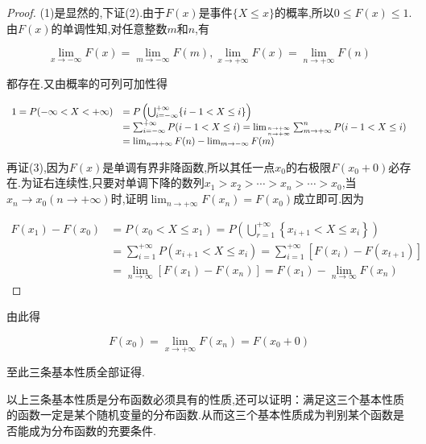 \begin{proof}
	(1)是显然的,下证(2).由于$ F(x) $是事件$\{X \leqslant x\}$的概率,所以$ 0\leq 
	F(x)\leq 1 $.由$ F(x) $的单调性知,对任意整数$ m $和$ n $,有
	
	\[ 
	\lim _{x \rightarrow-\infty} F(x)=\lim _{m \rightarrow-\infty} F(m), \lim _{x \rightarrow+\infty} F(x)=\lim _{n \rightarrow+\infty} F(n)
	\]
	
	都存在.又由概率的可列可加性得
	
	\[ 
	\begin{array}{ll}
	1=P(-\infty<X<+\infty)&=P\left(\bigcup_{i=-\infty}^{+\infty}\{i-1<X \leqslant i\}\right) \\ &=\sum_{i=-\infty}^{+\infty} P(i-1<X \leqslant i)=\lim _{n \rightarrow+\infty \atop n \rightarrow+\infty} \sum_{m \rightarrow+\infty}^{n} P(i-1<X \leqslant i) \\ &=\lim _{n \rightarrow+\infty} F(n)-\lim _{m \rightarrow-\infty} F(m)
	\end{array}
	\]
	
	再证(3),因为$ F(x) $是单调有界非降函数,所以其任一点$ x_0 $的右极限$ F(x_0+0) $必存在.为证右连续性,只要对单调下降的数列$x_{1}>x_{2}>\cdots>x_{n}>\cdots>x_{0}$,当$x_{n} \rightarrow x_{0}(n \rightarrow+\infty)$时,证明$\lim _{n \rightarrow+\infty} F\left(x_{n}\right)=F\left(x_{0}\right)$成立即可.因为
	
	\[ \begin{array}{ll}
	F\left(x_{1}\right)-F\left(x_{0}\right)&=P\left(x_{0}<X \leqslant x_{1}\right)=P\left(\bigcup_{r=1}^{+\infty}\left\{x_{i+1}<X \leqslant x_{i}\right\}\right) \\
	&=\sum_{i=1}^{+\infty} P\left(x_{i+1}<X \leqslant x_{i}\right)=\sum_{i=1}^{+\infty}\left[F\left(x_{i}\right)-F\left(x_{t+1}\right)\right] \\
	&=\lim _{n \rightarrow \infty}\left[F\left(x_{1}\right)-F\left(x_{n}\right)\right]=F\left(x_{1}\right)-\lim _{n \rightarrow \infty} F\left(x_{n}\right)
	\end{array}\]
\end{proof}

由此得

\[ 
F\left(x_{0}\right)=\lim _{x \rightarrow+\infty} F\left(x_{n}\right)=F\left(x_{0}+0\right)
\]

至此三条基本性质全部证得.

以上三条基本性质是分布函数必须具有的性质,还可以证明：满足这三个基本性质的函数一定是某个随机变量的分布函数.从而这三个基本性质成为判别某个函数是否能成为分布函数的充要条件.

